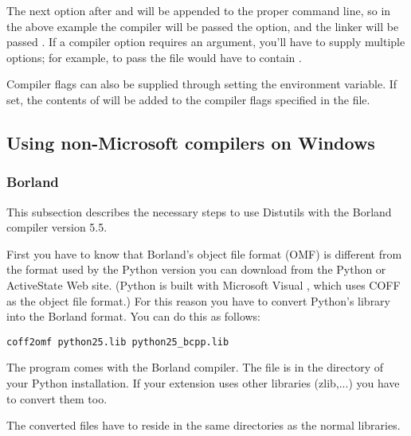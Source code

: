 \documentclass{howto}
\begin{document}
The next option after  and
 will be appended to the proper command line, so
in the above example the compiler will be passed the 
option, and the linker will be passed .  If a
compiler option requires an argument, you'll have to supply multiple
 options; for example, to pass  the
 file would have to contain
.

Compiler flags can also be supplied through setting the
 environment variable.  If set, the contents of
 will be added to the compiler flags specified in the 
 file.


\subsection{Using non-Microsoft compilers on Windows \label{non-ms-compilers}}

\subsubsection{Borland \Cpp}

This subsection describes the necessary steps to use Distutils with the 
Borland \Cpp{} compiler version 5.5.

First you have to know that Borland's object file format (OMF) is
different from the format used by the Python version you can download
from the Python or ActiveState Web site.  (Python is built with
Microsoft Visual \Cpp, which uses COFF as the object file format.)
For this reason you have to convert Python's library
 into the Borland format.  You can do this as
follows:

\begin{verbatim}
coff2omf python25.lib python25_bcpp.lib
\end{verbatim}

The  program comes with the Borland compiler.  The file
 is in the  directory of your Python
installation.  If your extension uses other libraries (zlib,...) you
have to convert them too.

The converted files have to reside in the same directories as the
normal libraries.
\end{document}
